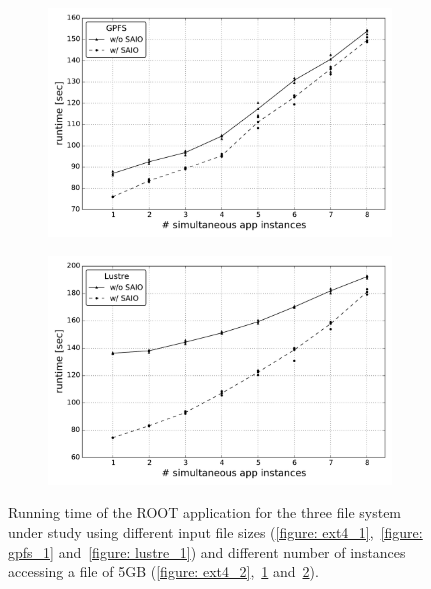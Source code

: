 \begin{figure}[!htb]
\begin{subfigure}[b]{0.32\textwidth}
    \includegraphics[width=\textwidth]{figures/SC2015/ROOT/cluster/multiple_instances/simult_instance_gpfs_test_cluster}
    \caption{\textit{}}
    \label{figure: gpfs_2}
  \end{subfigure}
  \begin{subfigure}[b]{0.32\textwidth}
    \centering
    \includegraphics[width=\textwidth]{figures/SC2015/ROOT/cluster/multiple_instances/multiple_simult_procs_Lustre_testcluster}
    \caption{\textit{}}
    \label{figure: lustre_2}
  \end{subfigure}
  \caption{Running time of the ROOT application for the three file system under study using different input file sizes (\ref{figure: ext4_1},~\ref{figure: gpfs_1} and~\ref{figure: lustre_1}) and different number of instances accessing a file of 5GB (\ref{figure: ext4_2},~\ref{figure: gpfs_2} and~\ref{figure: lustre_2}).}
  \label{figure: runtime}
\end{figure}
